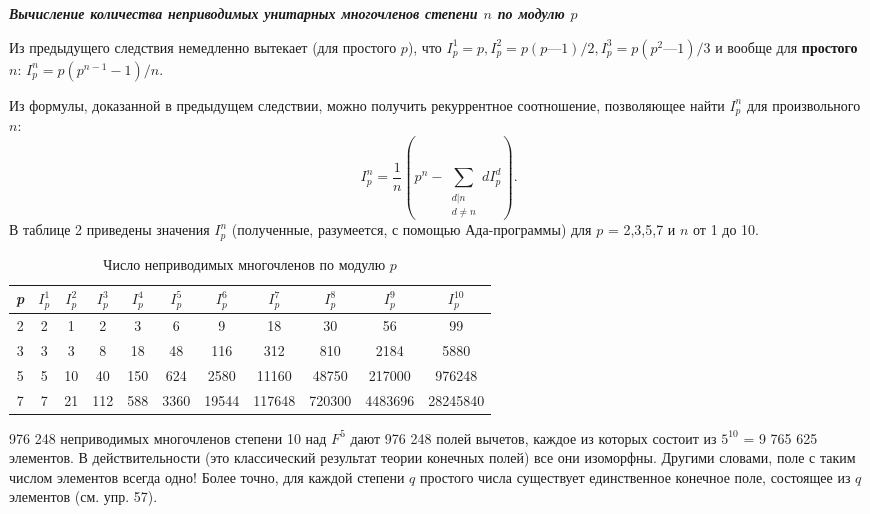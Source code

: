 \documentclass{mai_book}
\begin{document}
\noindent\textbf{\textit{Вычисление количества неприводимых унитарных\newline 
многочленов степени $n$ по модулю $p$ }}

Из предыдущего следствия немедленно вытекает (для простого $p$), 
что $I^1_p = p, I^2_p = p(p — 1)\slash2, I^3_p = p(p^2 — 1)\slash3$ и вообще для  \textbf{простого} $n$: 
$I^n_p = p(p^{n-1} - 1)\slash n$. 

Из формулы, доказанной в предыдущем следствии, можно получить 
рекуррентное соотношение, позволяющее найти $I^n_p$ для  
произвольного $n$: 
\begin{equation*}
I^n_p = \frac{1}{n}(p^n - \sum_{\substack{d|n\\d\neq n}}dI^d_p).
\end{equation*}
В таблице 2 приведены значения $I^n_p$ (полученные, разумеется, с  
помощью Ада-программы) для $p$ = 2,3,5,7 и $n$ от 1 до 10. 

\begin{table}[h!]
\centering
\label{}
\begin{small}
\begin{tabular}{|c|cccccccccc|}
\hline
\textit{p} & $I^1_p$ & $I^2_p$ & $I^3_p$ & $I^4_p$ & $I^5_p$ & $I^6_p$ & $I^7_p$  & $I^8_p$  & $I^9_p$   & $I^{10}_p$   \\ \hline
2          & 2     & 1     & 2     & 3     & 6     & 9     & 18     & 30     & 56      & 99       \\
3          & 3     & 3     & 8     & 18    & 48    & 116   & 312    & 810    & 2184    & 5880     \\
5          & 5     & 10    & 40    & 150   & 624   & 2580  & 11160  & 48750  & 217000  & 976248   \\
7          & 7     & 21    & 112   & 588   & 3360  & 19544 & 117648 & 720300 & 4483696 & 28245840 \\ \hline
\end{tabular}
\end{small}
\caption{Число неприводимых многочленов по модулю $p$} 
\end{table}

\begin{mynotice}
976 248 неприводимых многочленов степени 10 над 
$F^5$ дают 976 248 полей вычетов, каждое из которых состоит из 
$5^{10}$ = 9 765 625 элементов. В действительности (это классический 
результат теории конечных полей) все они изоморфны. Другими 
словами, поле с таким числом элементов всегда одно! Более точно, 
для каждой степени $q$ простого числа существует единственное 
конечное поле, состоящее из $q$ элементов (см. упр. 57).\newline 
\end{mynotice}
\end{document}
